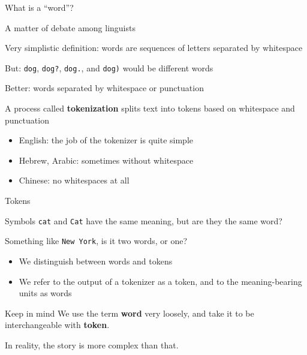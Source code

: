 \documentclass[12pt,aspectratio=169,handout]{beamer}
\begin{document}
\begin{frame}{What is a ``word''?}

A matter of debate among linguists

Very simplistic definition: words are sequences of letters separated by whitespace

But: \texttt{dog}, \texttt{dog?}, \texttt{dog.}, and \texttt{dog)} would be different words

Better: words separated by whitespace or punctuation

A process called \textbf{tokenization} splits text into tokens based on whitespace and punctuation

\begin{itemize}
	\item English: the job of the tokenizer is quite simple
	\item Hebrew, Arabic: sometimes without whitespace
	\item Chinese: no whitespaces at all
\end{itemize}



\end{frame}

\begin{frame}{Tokens}
	
Symbols \texttt{cat} and \texttt{Cat} have the same meaning, but are they the same word?

Something like \texttt{New York}, is it two words, or one?

\begin{itemize}
	\item We distinguish between words and tokens
	\item We refer to the output of a tokenizer as a token, and to the meaning-bearing units as words
\end{itemize}

\begin{block}{Keep in mind}
We use the term \textbf{word} very loosely, and take it to be interchangeable with \textbf{token}.

In reality, the story is more complex than that.	
\end{block}
	
\end{frame}
\end{document}

